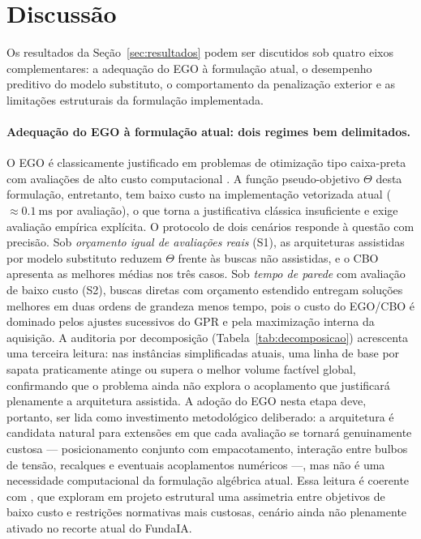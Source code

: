 \section{Discussão}
\label{sec:discussao}

Os resultados da Seção~\ref{sec:resultados} podem ser discutidos sob quatro eixos complementares: a adequação do EGO à formulação atual, o desempenho preditivo do modelo substituto, o comportamento da penalização exterior e as limitações estruturais da formulação implementada.

\paragraph{Adequação do EGO à formulação atual: dois regimes bem delimitados.}
O EGO é classicamente justificado em problemas de otimização tipo caixa-preta com avaliações de alto custo computacional . A função pseudo-objetivo $\Theta$ desta formulação, entretanto, tem baixo custo na implementação vetorizada atual ($\approx \SI{0,1}{\milli\second}$ por avaliação), o que torna a justificativa clássica insuficiente e exige avaliação empírica explícita. O protocolo de dois cenários responde à questão com precisão. Sob \textit{orçamento igual de avaliações reais} (S1), as arquiteturas assistidas por modelo substituto reduzem $\Theta$ frente às buscas não assistidas, e o CBO apresenta as melhores médias nos três casos. Sob \textit{tempo de parede} com avaliação de baixo custo (S2), buscas diretas com orçamento estendido entregam soluções melhores em duas ordens de grandeza menos tempo, pois o custo do EGO/CBO é dominado pelos ajustes sucessivos do GPR e pela maximização interna da aquisição. A auditoria por decomposição (Tabela~\ref{tab:decomposicao}) acrescenta uma terceira leitura: nas instâncias simplificadas atuais, uma linha de base por sapata praticamente atinge ou supera o melhor volume factível global, confirmando que o problema ainda não explora o acoplamento que justificará plenamente a arquitetura assistida. A adoção do EGO nesta etapa deve, portanto, ser lida como investimento metodológico deliberado: a arquitetura é candidata natural para extensões em que cada avaliação se tornará genuinamente custosa — posicionamento conjunto com empacotamento, interação entre bulbos de tensão, recalques e eventuais acoplamentos numéricos —, mas não é uma necessidade computacional da formulação algébrica atual. Essa leitura é coerente com , que exploram em projeto estrutural uma assimetria entre objetivos de baixo custo e restrições normativas mais custosas, cenário ainda não plenamente ativado no recorte atual do FundaIA.

